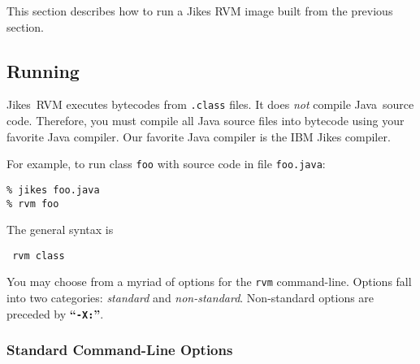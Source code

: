 This section describes how to run a Jikes\trademark{} RVM  image built
from the previous section. 

\subsection{Running \jrvm}

Jikes\trademark\ RVM executes bytecodes from {\tt .class} files. It does {\em
not} compile 
Java\trademark\ source code. Therefore, you must compile all Java source
files into bytecode using your favorite Java compiler.
Our favorite Java compiler is the IBM Jikes compiler. 

For example, to run class {\tt foo} with source code in file {\tt foo.java}:
\begin{verbatim}
% jikes foo.java
% rvm foo 
\end{verbatim}

The general syntax is
\begin{example}
\tt{}   rvm  class 
\end{example}

You may choose from a myriad of options for the {\tt rvm} command-line.  
Options fall into two categories: {\em standard} and {\em
non-standard}.  Non-standard options are preceded by {\bf ``{\tt -X:}''}.

\subsubsection{Standard Command-Line Options}

